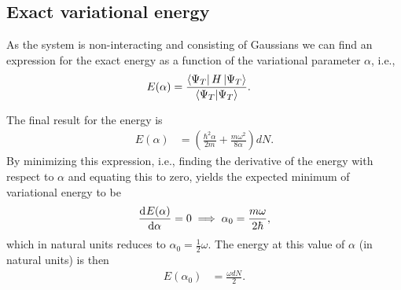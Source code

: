 \documentclass[
    a4paper, aps, twocolumn, floatfix, superscriptaddress, nofootinbib]{revtex4-1}
\newcommand{\1}{\mathds{1}}
\newcommand{\half}{\frac{1}{2}}
\begin{document}
    \subsection{Exact variational energy}
        As the system is non-interacting and consisting of Gaussians we can
        find an expression for the exact energy as a function of the
        variational parameter $\alpha$, i.e.,
        \begin{align}
            E(\alpha)
            &=
            \frac{\bra{\Psi_T}H\ket{\Psi_T}}{\bra{\Psi_T}\ket{\Psi_T}}.
        \end{align}

        The final result for the energy is
        \begin{align}
            E(\alpha)
            &=
            \left(
                \frac{\hbar^2 \alpha}{2m}
                + \frac{m\omega^2}{8\alpha}
            \right)dN.
        \end{align}
        By minimizing this expression, i.e., finding the derivative of the
        energy with respect to $\alpha$ and equating this to zero, yields the
        expected minimum of variational energy to be
        \begin{align}
            \dod[]{E(\alpha)}{\alpha} = 0
            \implies
            \alpha_0 = \frac{m\omega}{2\hbar},
        \end{align}
        which in natural units reduces to $\alpha_0 = \half\omega$. The energy at
        this value of $\alpha$ (in natural units) is then
        \begin{align}
            E(\alpha_0)
            &=
            \frac{\omega dN}{2}.
        \end{align}
\end{document}
